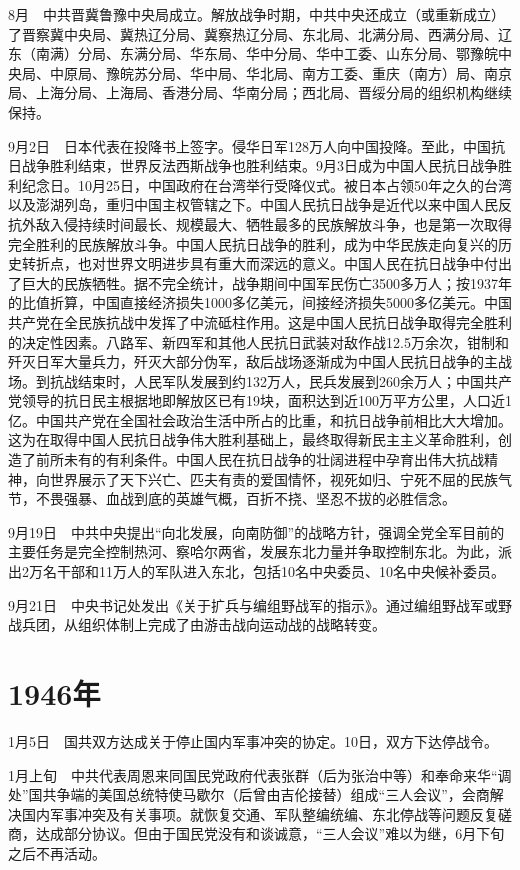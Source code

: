 \documentclass[10pt,a4paper,twocolumn]{book}
\begin{document}
8月　中共晋冀鲁豫中央局成立。解放战争时期，中共中央还成立（或重新成立）了晋察冀中央局、冀热辽分局、冀察热辽分局、东北局、北满分局、西满分局、辽东（南满）分局、东满分局、华东局、华中分局、华中工委、山东分局、鄂豫皖中央局、中原局、豫皖苏分局、华中局、华北局、南方工委、重庆（南方）局、南京局、上海分局、上海局、香港分局、华南分局；西北局、晋绥分局的组织机构继续保持。

9月2日　日本代表在投降书上签字。侵华日军128万人向中国投降。至此，中国抗日战争胜利结束，世界反法西斯战争也胜利结束。9月3日成为中国人民抗日战争胜利纪念日。10月25日，中国政府在台湾举行受降仪式。被日本占领50年之久的台湾以及澎湖列岛，重归中国主权管辖之下。中国人民抗日战争是近代以来中国人民反抗外敌入侵持续时间最长、规模最大、牺牲最多的民族解放斗争，也是第一次取得完全胜利的民族解放斗争。中国人民抗日战争的胜利，成为中华民族走向复兴的历史转折点，也对世界文明进步具有重大而深远的意义。中国人民在抗日战争中付出了巨大的民族牺牲。据不完全统计，战争期间中国军民伤亡3500多万人；按1937年的比值折算，中国直接经济损失1000多亿美元，间接经济损失5000多亿美元。中国共产党在全民族抗战中发挥了中流砥柱作用。这是中国人民抗日战争取得完全胜利的决定性因素。八路军、新四军和其他人民抗日武装对敌作战12.5万余次，钳制和歼灭日军大量兵力，歼灭大部分伪军，敌后战场逐渐成为中国人民抗日战争的主战场。到抗战结束时，人民军队发展到约132万人，民兵发展到260余万人；中国共产党领导的抗日民主根据地即解放区已有19块，面积达到近100万平方公里，人口近1亿。中国共产党在全国社会政治生活中所占的比重，和抗日战争前相比大大增加。这为在取得中国人民抗日战争伟大胜利基础上，最终取得新民主主义革命胜利，创造了前所未有的有利条件。中国人民在抗日战争的壮阔进程中孕育出伟大抗战精神，向世界展示了天下兴亡、匹夫有责的爱国情怀，视死如归、宁死不屈的民族气节，不畏强暴、血战到底的英雄气概，百折不挠、坚忍不拔的必胜信念。

9月19日　中共中央提出“向北发展，向南防御”的战略方针，强调全党全军目前的主要任务是完全控制热河、察哈尔两省，发展东北力量并争取控制东北。为此，派出2万名干部和11万人的军队进入东北，包括10名中央委员、10名中央候补委员。

9月21日　中央书记处发出《关于扩兵与编组野战军的指示》。通过编组野战军或野战兵团，从组织体制上完成了由游击战向运动战的战略转变。

\section{1946年}

1月5日　国共双方达成关于停止国内军事冲突的协定。10日，双方下达停战令。

1月上旬　中共代表周恩来同国民党政府代表张群（后为张治中等）和奉命来华“调处”国共争端的美国总统特使马歇尔（后曾由吉伦接替）组成“三人会议”，会商解决国内军事冲突及有关事项。就恢复交通、军队整编统编、东北停战等问题反复磋商，达成部分协议。但由于国民党没有和谈诚意，“三人会议”难以为继，6月下旬之后不再活动。
\end{document}
